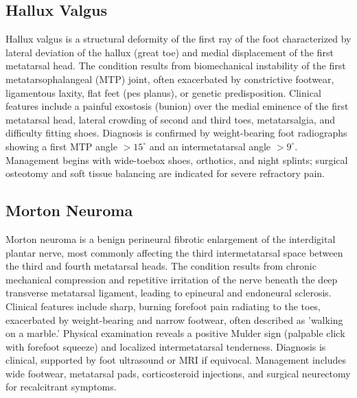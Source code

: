\subsection{Hallux Valgus}
\label{sec:Hallux Valgus}
Hallux valgus is a structural deformity of the first ray of the foot characterized by lateral deviation of the hallux (great toe) and medial displacement of the first metatarsal head. The condition results from biomechanical instability of the first metatarsophalangeal (MTP) joint, often exacerbated by constrictive footwear, ligamentous laxity, flat feet (pes planus), or genetic predisposition. Clinical features include a painful exostosis (bunion) over the medial eminence of the first metatarsal head, lateral crowding of second and third toes, metatarsalgia, and difficulty fitting shoes. Diagnosis is confirmed by weight-bearing foot radiographs showing a first MTP angle $>15^\circ$ and an intermetatarsal angle $>9^\circ$. Management begins with wide-toebox shoes, orthotics, and night splints; surgical osteotomy and soft tissue balancing are indicated for severe refractory pain.

\subsection{Morton Neuroma}
\label{sec:Morton Neuroma}
Morton neuroma is a benign perineural fibrotic enlargement of the interdigital plantar nerve, most commonly affecting the third intermetatarsal space between the third and fourth metatarsal heads. The condition results from chronic mechanical compression and repetitive irritation of the nerve beneath the deep transverse metatarsal ligament, leading to epineural and endoneural sclerosis. Clinical features include sharp, burning forefoot pain radiating to the toes, exacerbated by weight-bearing and narrow footwear, often described as 'walking on a marble.' Physical examination reveals a positive Mulder sign (palpable click with forefoot squeeze) and localized intermetatarsal tenderness. Diagnosis is clinical, supported by foot ultrasound or MRI if equivocal. Management includes wide footwear, metatarsal pads, corticosteroid injections, and surgical neurectomy for recalcitrant symptoms.

